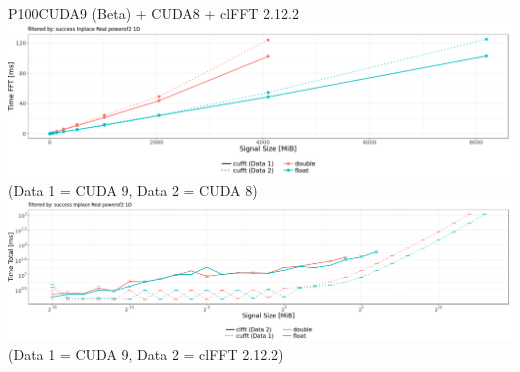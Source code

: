 \documentclass[t,11pt,hyperref={
  pdftitle = {gearshifft},
  pdfsubject = {gearshifft},
  pdfborder={0 0 0},
  colorlinks=true,
  urlcolor=red,
  citecolor=red,
  linkcolor=red,
  pdfauthor={Peter Steinbach, Matthias Werner}
  }
]{beamer}
\begin{document}
\begin{frame}{P100}{CUDA9 (Beta) + CUDA8 + clFFT 2.12.2}
\centering
\hspace*{-2em}  \includegraphics[width=1.1\textwidth]{p100-cuda9-cuda8.png}
{\scriptsize{(Data 1 = CUDA 9, Data 2 = CUDA 8)}}
\hspace*{-2em}  \includegraphics[width=1.1\textwidth]{p100-clfft-cuda9.png}
{\scriptsize{(Data 1 = CUDA 9, Data 2 = clFFT 2.12.2)}}
\end{frame}

  
  
  
\end{document}
